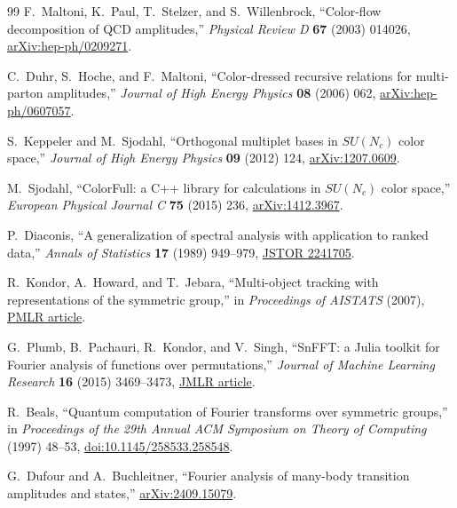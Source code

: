 \documentclass[11pt,a4paper]{article}
\begin{document}
\begin{thebibliography}{99}
F.~Maltoni, K.~Paul, T.~Stelzer, and S.~Willenbrock,
``Color-flow decomposition of QCD amplitudes,''
\emph{Physical Review D} \textbf{67} (2003) 014026,
\href{https://arxiv.org/abs/hep-ph/0209271}{arXiv:hep-ph/0209271}.

C.~Duhr, S.~Hoche, and F.~Maltoni,
``Color-dressed recursive relations for multi-parton amplitudes,''
\emph{Journal of High Energy Physics} \textbf{08} (2006) 062,
\href{https://arxiv.org/abs/hep-ph/0607057}{arXiv:hep-ph/0607057}.

S.~Keppeler and M.~Sjodahl,
``Orthogonal multiplet bases in $SU(N_c)$ color space,''
\emph{Journal of High Energy Physics} \textbf{09} (2012) 124,
\href{https://arxiv.org/abs/1207.0609}{arXiv:1207.0609}.

M.~Sjodahl,
``ColorFull: a C++ library for calculations in $SU(N_c)$ color space,''
\emph{European Physical Journal C} \textbf{75} (2015) 236,
\href{https://arxiv.org/abs/1412.3967}{arXiv:1412.3967}.

P.~Diaconis,
``A generalization of spectral analysis with application to ranked data,''
\emph{Annals of Statistics} \textbf{17} (1989) 949--979,
\href{https://www.jstor.org/stable/2241705}{JSTOR 2241705}.

R.~Kondor, A.~Howard, and T.~Jebara,
``Multi-object tracking with representations of the symmetric group,''
in \emph{Proceedings of AISTATS} (2007),
\href{https://proceedings.mlr.press/v2/kondor07a.html}{PMLR article}.

G.~Plumb, B.~Pachauri, R.~Kondor, and V.~Singh,
``SnFFT: a Julia toolkit for Fourier analysis of functions over permutations,''
\emph{Journal of Machine Learning Research} \textbf{16} (2015) 3469--3473,
\href{https://jmlr.org/papers/v16/plumb15a.html}{JMLR article}.

R.~Beals,
``Quantum computation of Fourier transforms over symmetric groups,''
in \emph{Proceedings of the 29th Annual ACM Symposium on Theory of
Computing} (1997) 48--53,
\href{https://doi.org/10.1145/258533.258548}{doi:10.1145/258533.258548}.

G.~Dufour and A.~Buchleitner,
``Fourier analysis of many-body transition amplitudes and states,''
\href{https://arxiv.org/abs/2409.15079}{arXiv:2409.15079}.

\end{thebibliography}
\end{document}
